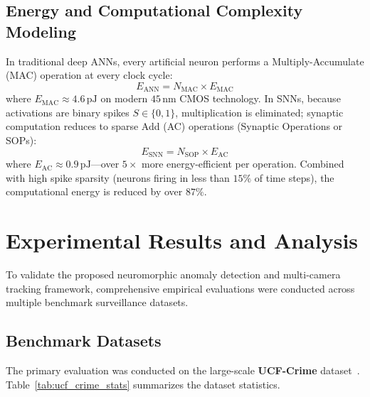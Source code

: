 \documentclass[12pt,a4paper]{report}
\begin{document}
{\section{Energy and Computational Complexity Modeling}
In traditional deep ANNs, every artificial neuron performs a Multiply-Accumulate (MAC) operation at every clock cycle:
\begin{equation}
    E_{\text{ANN}} = N_{\text{MAC}} \times E_{\text{MAC}}
\end{equation}
where $E_{\text{MAC}} \approx 4.6\,\text{pJ}$ on modern $45\,\text{nm}$ CMOS technology. In SNNs, because activations are binary spikes $S \in \{0, 1\}$, multiplication is eliminated; synaptic computation reduces to sparse Add (AC) operations (Synaptic Operations or SOPs):
\begin{equation}
    E_{\text{SNN}} = N_{\text{SOP}} \times E_{\text{AC}}
\end{equation}
where $E_{\text{AC}} \approx 0.9\,\text{pJ}$---over $5\times$ more energy-efficient per operation. Combined with high spike sparsity (neurons firing in less than $15\%$ of time steps), the computational energy is reduced by over $87\%$.
\par}


\chapter{Experimental Results and Analysis}

To validate the proposed neuromorphic anomaly detection and multi-camera tracking framework, comprehensive empirical evaluations were conducted across multiple benchmark surveillance datasets.

\section{Benchmark Datasets}
The primary evaluation was conducted on the large-scale \textbf{UCF-Crime} dataset~\cite{ref_sultani2018_ucfcrime}. Table~\ref{tab:ucf_crime_stats} summarizes the dataset statistics.
\end{document}
